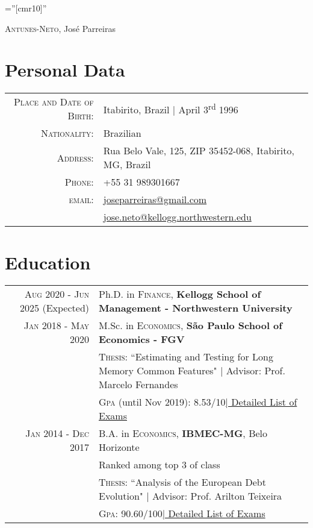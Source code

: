 \documentclass[a4paper,10pt]{article}
\begin{document}
\pagestyle{empty} %

\font\fb=''[cmr10]'' %

\par{\centering
		{\Huge \textsc{Antunes-Neto}, José Parreiras
	}\bigskip\par}

\section{Personal Data}

\begin{tabular}{rp{9.75cm}}
    \textsc{Place and Date of Birth:} & Itabirito, Brazil  | April 3\textsuperscript{rd}  1996 \\
    \textsc{Nationality:} & Brazilian\\
    \textsc{Address:}   & Rua Belo Vale, 125, ZIP 35452-068, Itabirito, MG, Brazil \\
    \textsc{Phone:}     & +55 31 989301667\\
    \textsc{email:}     & \href{mailto:joseparreiras@gmail.com}{joseparreiras@gmail.com} \\
    & \href{mailto:jose.neto@kellogg.northwestern.edu}{jose.neto@kellogg.northwestern.edu}
\end{tabular}


\section{Education}
\begin{tabular}{r|p{8.75cm}}	
\textsc{Aug} 2020 - \textsc{Jun} 2025 (Expected) & Ph.D. in \textsc{Finance}, \normalsize\textbf{Kellogg School of Management - Northwestern University} \\
\textsc{Jan} 2018 - \textsc{May} 2020 & M.Sc. in \textsc{Economics}, \normalsize\textbf{São Paulo School of Economics - FGV} \\
& \normalsize \textsc{Thesis}: ``Estimating and Testing for Long Memory Common Features" | \small Advisor: Prof. Marcelo Fernandes \\ 
&\normalsize \textsc{Gpa} (until Nov 2019): 8.53/10\hyperlink{msc_grades}{\hfill | \footnotesize Detailed List of Exams}\\
\textsc{Jan} 2014 - \textsc{Dec} 2017& B.A. in \textsc{Economics}, \normalsize\textbf{IBMEC-MG}, Belo Horizonte \\
& \footnotesize{Ranked among top 3 of class} \\
& \normalsize \textsc{Thesis}: ``Analysis of the European Debt Evolution" | \small Advisor: Prof. Arilton Teixeira \\
&\normalsize \textsc{Gpa}: 90.60/100\hyperlink{ba_grades}{\hfill | \footnotesize Detailed List of Exams}\\
\end{tabular}
\end{document}
